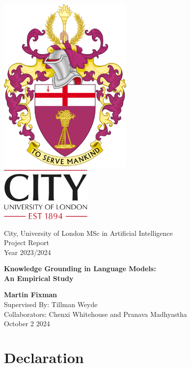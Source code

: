 \documentclass[a4paper,11pt]{article}
\begin{document}
\begin{titlepage}
	\centering
	\Large
	\sffamily

	\includegraphics[height=250pt]{to_serve_mankind.png} \\[1ex]
	\includegraphics[height=75pt]{City.png}

	City, University of London MSc in Artificial Intelligence \\
	Project Report \\
	Year 2023/2024

	\vfill{}

	\begin{huge}
		\bfseries
		Knowledge Grounding in Language Models: \\[1ex]
		An Empirical Study
	\end{huge}

	\vfill{}

	\textbf{Martin Fixman} \\
	Supervised By: Tillman Weyde \\
	Collaborators: Chenxi Whitehouse and Pranava Madhyastha \\[1em]
	October 2 2024
\end{titlepage}

\section*{Declaration}
\end{document}
